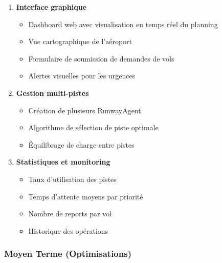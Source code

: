 \documentclass[12pt,a4paper]{article}
\begin{document}
\begin{enumerate}[leftmargin=*]
    \item \textbf{Interface graphique}
    \begin{itemize}
        \item Dashboard web avec visualisation en temps réel du planning
        \item Vue cartographique de l'aéroport
        \item Formulaire de soumission de demandes de vols
        \item Alertes visuelles pour les urgences
    \end{itemize}

    \item \textbf{Gestion multi-pistes}
    \begin{itemize}
        \item Création de plusieurs RunwayAgent
        \item Algorithme de sélection de piste optimale
        \item Équilibrage de charge entre pistes
    \end{itemize}

    \item \textbf{Statistiques et monitoring}
    \begin{itemize}
        \item Taux d'utilisation des pistes
        \item Temps d'attente moyens par priorité
        \item Nombre de reports par vol
        \item Historique des opérations
    \end{itemize}
\end{enumerate}

\subsubsection{Moyen Terme (Optimisations)}
\end{document}
